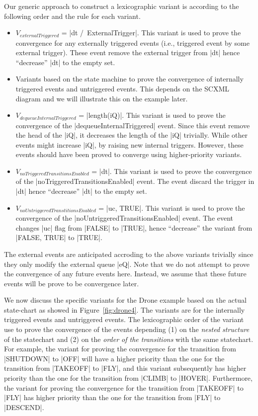 Our generic approach to construct a lexicographic variant is according
to the following order and the rule for each variant.
\begin{itemize}
\item $V_{externalTriggered}$ = |dt /\ ExternalTrigger|.  This variant
  is used to prove the convergence for any externally triggered events
  (i.e., triggered event by some external trigger). These event remove
  the external trigger from |dt| hence ``decrease'' |dt| to the empty
  set.

\item Variants based on the state machine to prove the convergence of
  internally triggered events and untriggered events.  This depends on
  the SCXML diagram and we will illustrate this on the example later.
  
\item $V_{dequeueInternalTriggered}$ = |length(iQ)|.  This variant is
  used to prove the convergence of the |dequeueInternalTriggered| event.
  Since this event remove the head of the |iQ|, it decreases the
  length of the |iQ| trivially.  While other events might increase
  |iQ|, by raising new internal triggers. However, these events should
  have been proved to converge using higher-priority variants.
  
\item $V_{noTriggeredTransitionsEnabled}$ = |dt|.  This variant is used to
  prove the convergence of the |noTriggeredTransitionsEnabled| event.
  The event discard the trigger in |dt| hence ``decrease'' |dt| to the
  empty set.
  
\item $V_{noUntriggeredTranstitionsEnabled}$ = |{uc, TRUE}|.  This variant is
  used to prove the convergence of the
  |noUntriggeredTransitionsEnabled| event.  The event changes |uc|
  flag from |FALSE| to |TRUE|, hence ``decrease'' the variant from
  |{FALSE, TRUE}| to |{TRUE}|.
\end{itemize}
The external events are anticipated accroding to the above variants
trivially since they only modify the external queue |eQ|.  Note that
we do not attempt to prove the convergence of any future events
here. Instead, we assume that these future events will be prove to be
convergence later.

We now discuss the specific variants for the Drone example based on
the actual state-chart as showed in Figure~\ref{fig:drone4}.  The
variants are for the internally triggered events and untriggered
events. The lexicographic order of the variant use to prove the
convergence of the events depending (1) on the \emph{nested structure}
of the statechart and (2) on the \emph{order of the transitions} with
the same statechart.  For example, the variant for proving the
convergence for the transition from |SHUTDOWN| to |OFF| will have a
higher priority than the one for the transition from |TAKEOFF| to
|FLY|, and this variant subsequently has higher priority than the one
for the transition from |CLIMB| to |HOVER|.  Furthermore, the variant
for proving the convergence for the transition from |TAKEOFF| to |FLY|
has higher priority than the one for the transition from |FLY| to
|DESCEND|.

